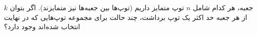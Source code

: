 \p
$k$
جعبه، هر کدام شامل
$n$
توپ متمایز داریم
(توپ‌ها بین جعبه‌ها نیز متمایزند).
اگر بتوان از هر جعبه حد اکثر یک توپ برداشت، چند حالت برای مجموعه توپ‌هایی
که در نهایت انتخاب شده‌اند وجود دارد؟